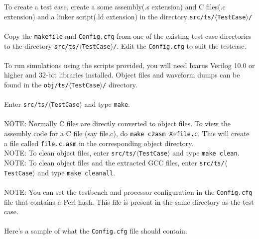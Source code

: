 \documentclass[10pt]{article}
\begin{document}
To create a test case, create a some assembly(.s extension) and 
C files(.c extension) and a linker script(.ld extension) in the directory 
\texttt{src/ts/$\langle$TestCase$\rangle$/}
\\
\\
Copy the \texttt{makefile} and \texttt{Config.cfg} from one of the existing test case directories 
to the directory \texttt{src/ts/$\langle$TestCase$\rangle$/}. Edit the \texttt{Config.cfg} to suit the testcase.
\\
\\
To run simulations using the scripts provided, you will need Icarus 
Verilog 10.0 or higher and 32-bit libraries installed. Object files and 
waveform dumps can be found in the \texttt{obj/ts/$\langle$TestCase$\rangle$/} directory.
\\
\\
Enter \texttt{src/ts/$\langle$TestCase$\rangle$} and type \texttt{make}.
\\
\\
NOTE: Normally C files are directly converted to object files. To view the assembly code for a C file (say file.c), do \texttt{make c2asm X=file.c}.
This will create a file called \texttt{file.c.asm} in the corresponding object directory.
\\
NOTE: To clean object files, enter \texttt{src/ts/$\langle$TestCase$\rangle$} and type \texttt{make clean}.
\\
NOTE: To clean object files and the extracted GCC files, enter \texttt{src/ts/$\langle$TestCase$\rangle$} and type \texttt{make cleanall}.
\\
\\
NOTE: You can set the testbench and processor configuration in the \texttt{Config.cfg} 
file that contains a Perl hash. This file is present in the same directory as 
the test case. 
\\
\\
Here's a sample of what the \texttt{Config.cfg} file should contain.
\\
\\
\end{document}
